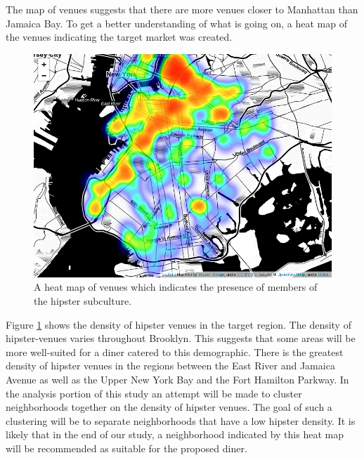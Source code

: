 \documentclass[12pt]{article}
\begin{document}
	The map of venues suggests that there are more venues closer to Manhattan than Jamaica Bay.
	To get a better understanding of what is going on, a heat map of the venues indicating the target market was created.
\begin{figure}[H]
  \includegraphics[width=6.5in]{hipster_heatmap.png}
  \caption{A heat map of venues which indicates the presence of members of the hipster subculture.}
  \label{fig:hipster_heatmap}
\end{figure}
	Figure \ref{fig:hipster_heatmap} shows the density of hipster venues in the target region.
	The density of hipster-venues varies throughout Brooklyn.
	This suggests that some areas will be more well-suited for a diner catered to this demographic.
	There is the greatest density of hipster venues in the regions between the East River and Jamaica Avenue as well as the Upper New York Bay and the Fort Hamilton Parkway.
	In the analysis portion of this study an attempt will be made to cluster neighborhoods together on the density of hipster venues.
	The goal of such a clustering will be to separate neighborhoods that have a low hipster density.
	It is likely that in the end of our study, a neighborhood indicated by this heat map will be recommended as suitable for the proposed diner.
	
\end{document}
